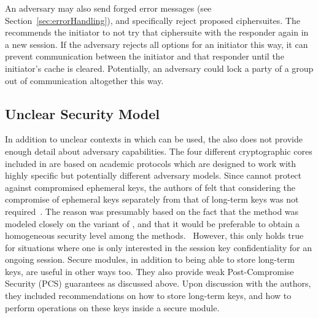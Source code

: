 \documentclass[runningheads]{llncs}
\begin{document}
An adversary may also send forged error messages (see
Section~\ref{sec:errorHandling}), and specifically reject proposed ciphersuites.
%
The \mEdhoc{} \mSpec{} recommends the initiator to not try that ciphersuite 
with
the responder again in a new session.
%
If the adversary rejects all options for an initiator this way, it can prevent
communication between the initiator and that responder until the initiator's
cache is cleared.
%
Potentially, an adversary could lock a party of a group out of communication
altogether this way.
%

\subsection{Unclear Security Model}
In addition to unclear contexts in which
\mEdhoc{} can be used, the \mSpec{} also does not provide enough detail 
about
adversary capabilities.
%
The four different cryptographic cores included in \mEdhoc{} are based on
academic protocols which are designed to work with highly specific but
potentially different adversary models.
%
Since \mSigma{} cannot protect against compromised ephemeral keys, the 
authors
of \mEdhoc{} felt that considering the compromise of ephemeral keys 
separately
from that of long-term keys was not required~\cite{personalCommunication}.
%
The reason was presumably based on the fact that the \mSigSig{} method was
modeled closely on the \mSigmaI{} variant of \mSigma{}, and that it would be
preferable to obtain a homogeneous security level among the \mEdhoc{}
methods.~\cite{Norr21}
%
However, this only holds true for situations where one is only interested in 
the
session key confidentiality for an ongoing session.
%
Secure modules, in addition to being able to store long-term keys, are useful 
in
other ways too.
%
They also provide weak Post-Compromise Security (PCS) guarantees as 
discussed
above.
%
Upon discussion with the authors, they included recommendations on how to 
store
long-term keys, and how to perform operations on these keys inside a secure
module.
%

\end{document}
